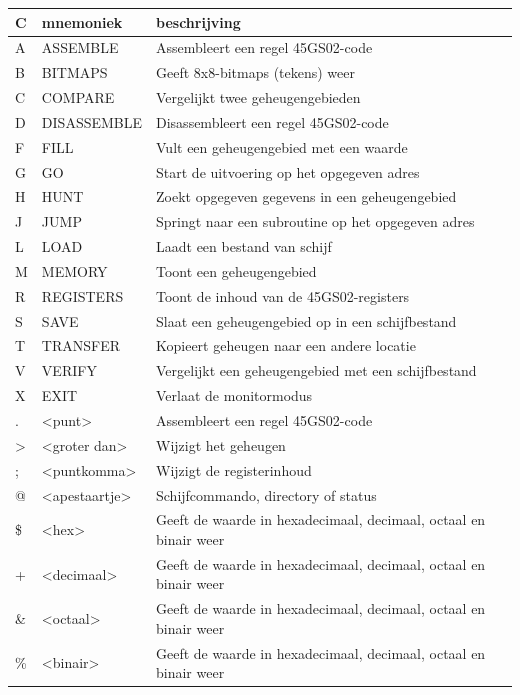 {
\ttfamily
\setlength{\tabcolsep}{1mm}
\begin{center}
\begin{tabular}{|l|l|L{6.5cm}|}
\hline
C & mnemoniek & beschrijving \\
\hline
A &     ASSEMBLE        & Assembleert een regel 45GS02-code\\B &     BITMAPS         & Geeft 8x8-bitmaps (tekens) weer\\C &     COMPARE         & Vergelijkt twee geheugengebieden\\D &     DISASSEMBLE     & Disassembleert een regel 45GS02-code\\F &     FILL            & Vult een geheugengebied met een waarde \\G &     GO              & Start de uitvoering op het opgegeven adres\\H &     HUNT            & Zoekt opgegeven gegevens in een geheugengebied\\J &     JUMP            & Springt naar een subroutine op het opgegeven adres\\L &     LOAD            & Laadt een bestand van schijf\\M &     MEMORY          & Toont een geheugengebied\\R &     REGISTERS       & Toont de inhoud van de 45GS02-registers\\S &     SAVE            & Slaat een geheugengebied op in een schijfbestand\\T &     TRANSFER        & Kopieert geheugen naar een andere locatie\\V &     VERIFY          & Vergelijkt een geheugengebied met een schijfbestand\\X &     EXIT            & Verlaat de monitormodus\\
\hline
 . &     <punt>          & Assembleert een regel 45GS02-code\\ > &     <groter dan>    & Wijzigt het geheugen\\ ; &     <puntkomma>     & Wijzigt de registerinhoud\\ @ &     <apestaartje>      & Schijfcommando, directory of status\\
\hline
\$ &     <hex>           & Geeft de waarde in hexadecimaal, decimaal, octaal en binair weer \\ + &     <decimaal>      & Geeft de waarde in hexadecimaal, decimaal, octaal en binair weer\\\& &     <octaal>        & Geeft de waarde in hexadecimaal, decimaal, octaal en binair weer\\\% &     <binair>        & Geeft de waarde in hexadecimaal, decimaal, octaal en binair weer\\
\hline
\end{tabular}
\end{center}
}

